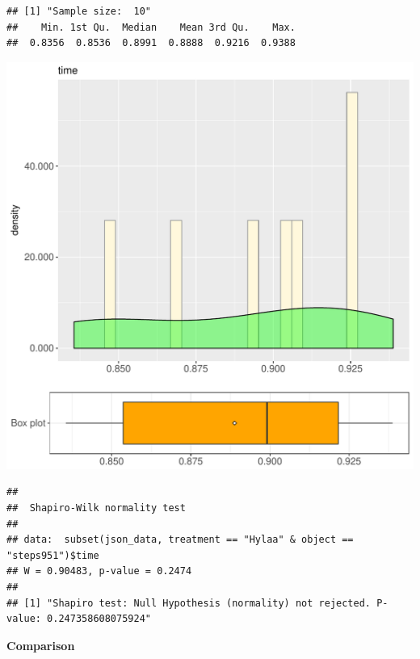 \documentclass{article}\usepackage[]{graphicx}\usepackage[]{color}
\makeatletter
\def\maxwidth{ %
  \ifdim\Gin@nat@width>\linewidth
    \linewidth
  \else
    \Gin@nat@width
  \fi
}
\newenvironment{kframe}{%
 \def\at@end@of@kframe{}%
 \ifinner\ifhmode%
  \def\at@end@of@kframe{\end{minipage}}%
  \begin{minipage}{\columnwidth}%
 \fi\fi%
 \def\FrameCommand##1{\hskip\@totalleftmargin \hskip-\fboxsep
 \colorbox{shadecolor}{##1}\hskip-\fboxsep
     \hskip-\linewidth \hskip-\@totalleftmargin \hskip\columnwidth}%
 \MakeFramed {\advance\hsize-\width
   \@totalleftmargin\z@ \linewidth\hsize
   \@setminipage}}%
 {\par\unskip\endMakeFramed%
 \at@end@of@kframe}
\newenvironment{knitrout}{}{} %
\makeatother
\begin{document}
\begin{knitrout}
\color{fgcolor}\begin{kframe}
\begin{verbatim}
## [1] "Sample size:  10"
##    Min. 1st Qu.  Median    Mean 3rd Qu.    Max. 
##  0.8356  0.8536  0.8991  0.8888  0.9216  0.9388
\end{verbatim}
\end{kframe}
\includegraphics[width=\maxwidth]{figure/RH2_Hylaa_steps951-1} 
\begin{kframe}\begin{verbatim}
## 
## 	Shapiro-Wilk normality test
## 
## data:  subset(json_data, treatment == "Hylaa" & object == "steps951")$time
## W = 0.90483, p-value = 0.2474
## 
## [1] "Shapiro test: Null Hypothesis (normality) not rejected. P-value: 0.247358608075924"
\end{verbatim}
\end{kframe}
\end{knitrout}
  
 \textbf{Comparison}
  
\end{document}
